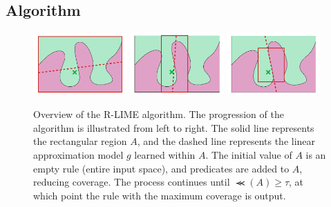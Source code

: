 \documentclass[runningheads]{llncs}
\begin{document}
\subsection{Algorithm}\label{sec:alg}
{%
	\begin{figure}[t]
		\centering
		\includegraphics[width=0.32\textwidth]{rlime1}
		\includegraphics[width=0.32\textwidth]{rlime2}
		\includegraphics[width=0.32\textwidth]{rlime3}
		\caption{%
			Overview of the R-LIME algorithm.
			The progression of the algorithm is illustrated from left to right.
			The solid line represents the rectangular region $A$,
			and the dashed line represents the linear approximation model $g$
			learned within $A$.
			The initial value of $A$ is an empty rule (entire input space),
			and predicates are added to $A$, reducing coverage.
			The process continues until $\Prec(A)\ge\tau$,
			at which point the rule with the maximum coverage is output.
		}
	\end{figure}
	\begin{algorithm}[p]
		
	\end{algorithm}
	\begin{algorithm}[p]
		
	\end{algorithm}
	\def\myidt{\hspace{\algorithmicindent}}
	\begin{algorithm}[p]
		
	\end{algorithm}
	\begin{algorithm}[p]
		
	\end{algorithm}
}
\end{document}
